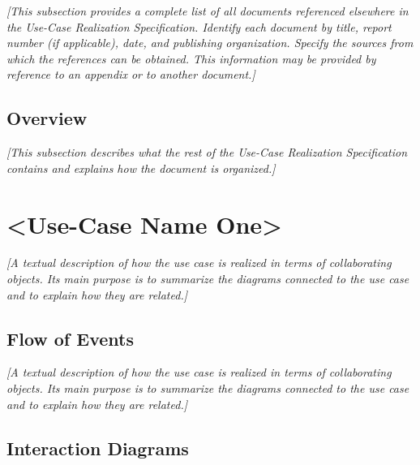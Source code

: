 \documentclass[12pt, a4paper, titlepage]{article}
\begin{document}
{\color{blue}\textit{[This subsection provides a complete list of all documents referenced elsewhere in the Use-Case Realization Specification. Identify each document by title, report number (if applicable), date, and publishing organization. Specify the sources from which the references can be obtained. This information may be provided by reference to an appendix or to another document.]}}

\subsection{Overview}

{\color{blue}\textit{[This subsection describes what the rest of the Use-Case Realization Specification contains and explains how the document is organized.]}}

\section{\textless Use-Case Name One\textgreater}

{\color{blue}\textit{[A textual description of how the use case is realized in terms of collaborating objects. Its main purpose is to summarize the diagrams connected to the use case and to explain how they are related.]}}

\subsection{Flow of Events}

{\color{blue}\textit{[A textual description of how the use case is realized in terms of collaborating objects. Its main purpose is to summarize the diagrams connected to the use case and to explain how they are related.]}}

\subsection{Interaction Diagrams}
\end{document}
